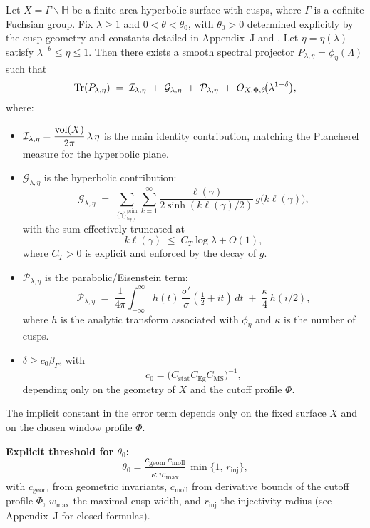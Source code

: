 \begin{theorem}\label{thm:intro-localized-trace}
Let $X=\Gamma\backslash\mathbb{H}$ be a finite-area hyperbolic surface with cusps,
where $\Gamma$ is a cofinite Fuchsian group.
Fix $\lambda\ge 1$ and $0<\theta<\theta_0$, with $\theta_0>0$ determined explicitly
by the cusp geometry and constants detailed in Appendix~J and .
Let $\eta=\eta(\lambda)$ satisfy $\lambda^{-\theta}\le \eta\le 1$.
Then there exists a smooth spectral projector $P_{\lambda,\eta}=\phi_\eta(\Lambda)$
such that
\[
  \operatorname{Tr}(P_{\lambda,\eta})
  \;=\;
  \mathcal{I}_{\lambda,\eta}
  \;+\;
  \mathcal{G}_{\lambda,\eta}
  \;+\;
  \mathcal{P}_{\lambda,\eta}
  \;+\;
  O_{X,\Phi,\theta}\!\big(\lambda^{1-\delta}\big),
\]
where:
\begin{itemize}
  \item $\mathcal{I}_{\lambda,\eta} = \dfrac{\operatorname{vol}(X)}{2\pi}\,\lambda\,\eta$
        is the main identity contribution, matching the Plancherel measure
        for the hyperbolic plane.
  \item $\mathcal{G}_{\lambda,\eta}$ is the hyperbolic contribution:
  \[
    \mathcal{G}_{\lambda,\eta}
    \;=\;
    \sum_{\{\gamma\}^{\mathrm{prim}}_{\mathrm{hyp}}}
    \sum_{k=1}^\infty
    \frac{\ell(\gamma)}{2\sinh(k\ell(\gamma)/2)}\,
    g\!\big(k\ell(\gamma)\big),
  \]
  with the sum effectively truncated at
  \[
    k\ell(\gamma)\;\leq\; C_T\log\lambda + O(1),
  \]
  where $C_T>0$ is explicit and enforced by the decay of $g$.
  \item $\mathcal{P}_{\lambda,\eta}$ is the parabolic/Eisenstein term:
  \[
    \mathcal{P}_{\lambda,\eta}
    \;=\;
    \frac{1}{4\pi}\int_{-\infty}^{\infty}
      h(t)\,\frac{\sigma'}{\sigma}(\tfrac{1}{2}+it)\,dt
    \;+\;
    \frac{\kappa}{4}\,h(i/2),
  \]
  where $h$ is the analytic transform associated with $\phi_\eta$
  and $\kappa$ is the number of cusps.
  \item $\delta \geq c_0 \beta_\Gamma$, with
        \[
          c_0 = \big(C_{\mathrm{stat}} C_{\mathrm{Eg}} C_{\mathrm{MS}}\big)^{-1},
        \]
        depending only on the geometry of $X$ and
        the cutoff profile $\Phi$.
\end{itemize}
The implicit constant in the error term depends only on the fixed surface $X$
and on the chosen window profile $\Phi$.

\noindent\textbf{Explicit threshold for $\theta_0$:}
\[
\theta_0 = \frac{c_{\mathrm{geom}}\,c_{\mathrm{moll}}}{\kappa\,w_{\max}}\,\min\{1,\,r_{\mathrm{inj}}\},
\]
with $c_{\mathrm{geom}}$ from geometric invariants,
$c_{\mathrm{moll}}$ from derivative bounds of the cutoff profile $\Phi$,
$w_{\max}$ the maximal cusp width, and $r_{\mathrm{inj}}$ the injectivity radius
(see Appendix~J for closed formulas).
\end{theorem}

